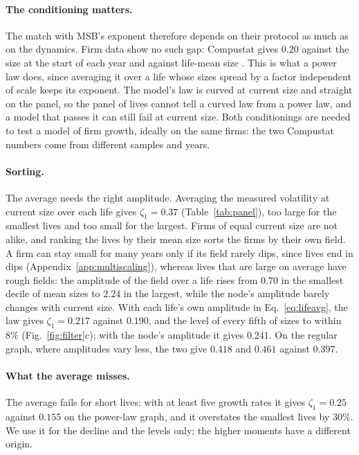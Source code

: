 \documentclass[pre,twocolumn,superscriptaddress,nofootinbib]{revtex4-2}
\begin{document}
\paragraph{The conditioning matters.}  The match with MSB's exponent therefore depends on their protocol as much as on
the dynamics.  Firm data show no such gap: Compustat gives $0.20$ against the size at the start of each year
\cite{amaral1997} and against life-mean size \cite{moran2024}.  This is what a power law does, since averaging it over
a life whose sizes spread by a factor independent of scale keeps its exponent.  The model's law is curved at current
size and straight on the panel, so the panel of lives cannot tell a curved law from a power law, and a model that
passes it can still fail at current size.  Both conditionings are needed to test a model of firm growth, ideally on
the same firms: the two Compustat numbers come from different samples and years.

\paragraph{Sorting.}  The average needs the right amplitude.  Averaging the measured volatility at current size over
each life gives $\zeta_1=0.37$ (Table~\ref{tab:panel}), too large for the smallest lives and too small for the largest.  Firms of equal
current size are not alike, and ranking the lives by their mean size sorts the firms by their own field.  A firm can
stay small for many years only if its field rarely dips, since lives end in dips (Appendix~\ref{app:multiscaling}),
whereas lives that are large on average have rough fields: the amplitude of the field over a life rises from $0.70$
in the smallest decile of mean sizes to $2.24$ in the largest, while the node's amplitude barely changes with current
size.  With each life's own amplitude in Eq.~\eqref{eq:lifeavg}, the law gives $\zeta_1=0.217$ against $0.190$, and
the level of every fifth of sizes to within $8\%$ (Fig.~\ref{fig:filter}c); with the node's amplitude it gives
$0.241$.  On the regular graph, where amplitudes vary less, the two give $0.418$ and $0.461$ against $0.397$.

\paragraph{What the average misses.}  The average fails for short lives: with at least five growth rates it gives
$\zeta_1=0.25$ against $0.155$ on the power-law graph, and it overstates the smallest lives by $30\%$.  We use it for
the decline and the levels only; the higher moments have a different origin.
\end{document}
